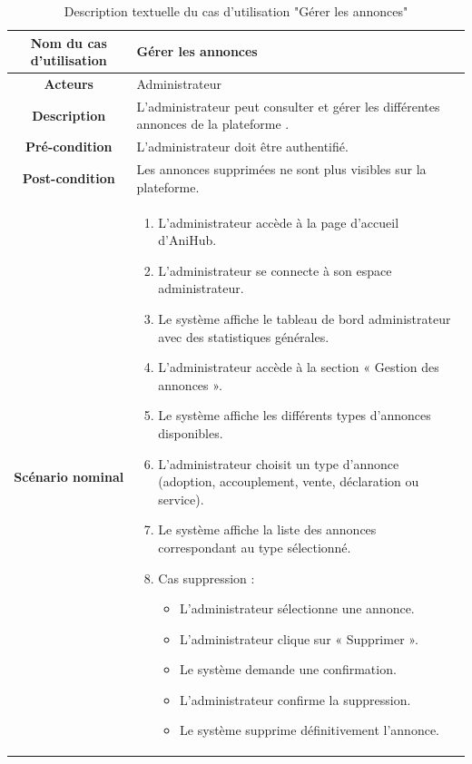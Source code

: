 \begin{longtable}{|c|p{11cm}|}
\caption{Description textuelle du cas d'utilisation "Gérer les annonces"}
\label{tab:gerer_annonces_admin} \\
\hline
\cellcolor{coloranihub}\textbf{Nom du cas d'utilisation } & Gérer les annonces \\
\hline
\cellcolor{coloranihub}\textbf{Acteurs} & Administrateur \\
\hline
\cellcolor{coloranihub}\textbf{Description } & L’administrateur peut consulter et gérer les différentes annonces de la plateforme .\\
\hline
\cellcolor{coloranihub}\textbf{Pré-condition } & L’administrateur doit être authentifié. \\
\hline
\cellcolor{coloranihub}\textbf{Post-condition } & Les annonces supprimées ne sont plus visibles sur la plateforme. \\
\hline

\cellcolor{coloranihub}\textbf{Scénario nominal } &
\begin{enumerate}
\item L’administrateur accède à la page d’accueil d’AniHub.
\item L’administrateur se connecte à son espace administrateur.
\item Le système affiche le tableau de bord administrateur avec des statistiques générales.
\item L’administrateur accède à la section « Gestion des annonces ».
\item Le système affiche les différents types d’annonces disponibles.
\item L’administrateur choisit un type d’annonce (adoption, accouplement, vente, déclaration ou service).
\item Le système affiche la liste des annonces correspondant au type sélectionné.

\item Cas suppression :
\begin{itemize}
\item L’administrateur sélectionne une annonce.
\item L’administrateur clique sur « Supprimer ».
\item Le système demande une confirmation.
\item L’administrateur confirme la suppression.
\item Le système supprime définitivement l’annonce.
\end{itemize}


\end{enumerate}
\end{longtable}
